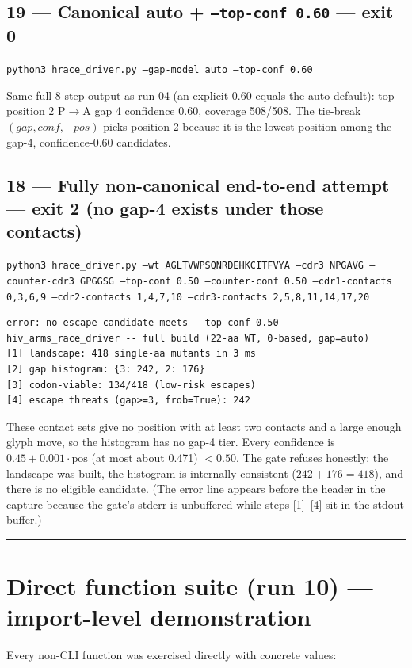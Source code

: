 \documentclass{article}
\begin{document}
\subsection*{19 --- Canonical auto + \texttt{--top-conf 0.60} --- exit 0}
\texttt{python3 hrace\_driver.py --gap-model auto --top-conf 0.60}

Same full 8-step output as run 04 (an explicit 0.60 equals the auto default):
top position 2 P\(\to\)A gap 4 confidence 0.60, coverage 508/508. The tie-break
\((gap, conf, -pos)\) picks position 2 because it is the lowest position among
the gap-4, confidence-0.60 candidates.

\subsection*{18 --- Fully non-canonical end-to-end attempt --- exit 2 (no gap-4 exists under those contacts)}
\texttt{python3 hrace\_driver.py --wt AGLTVWPSQNRDEHKCITFVYA --cdr3 NPGAVG --counter-cdr3 GPGGSG --top-conf 0.50 --counter-conf 0.50 --cdr1-contacts 0,3,6,9 --cdr2-contacts 1,4,7,10 --cdr3-contacts 2,5,8,11,14,17,20}

\begin{lstlisting}
error: no escape candidate meets --top-conf 0.50
hiv_arms_race_driver -- full build (22-aa WT, 0-based, gap=auto)
[1] landscape: 418 single-aa mutants in 3 ms
[2] gap histogram: {3: 242, 2: 176}
[3] codon-viable: 134/418 (low-risk escapes)
[4] escape threats (gap>=3, frob=True): 242
\end{lstlisting}

These contact sets give no position with at least two contacts and a large enough
glyph move, so the histogram has no gap-4 tier. Every confidence is
\(0.45 + 0.001\cdot\text{pos}\) (at most about 0.471) \(< 0.50\). The gate refuses
honestly: the landscape was built, the histogram is internally consistent
(\(242 + 176 = 418\)), and there is no eligible candidate. (The error line appears
before the header in the capture because the gate's stderr is unbuffered while
steps [1]--[4] sit in the stdout buffer.)

\hrule
\section{Direct function suite (run 10) --- import-level demonstration}

Every non-CLI function was exercised directly with concrete values:
\end{document}
